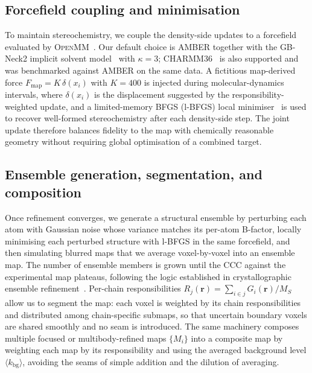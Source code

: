 \documentclass[11pt]{article}
\begin{document}
\subsection{Forcefield coupling and minimisation}
To maintain stereochemistry, we couple the density-side updates to a forcefield evaluated by \textsc{OpenMM}~\cite{eastman2017}. Our default choice is AMBER together with the GB-Neck2 implicit solvent model~\cite{nguyen2013} with $\kappa=3$; CHARMM36~\cite{huang2013} is also supported and was benchmarked against AMBER on the same data. A fictitious map-derived force $F_{\mathrm{map}} = K\,\delta(x_{i})$ with $K=400$ is injected during molecular-dynamics intervals, where $\delta(x_{i})$ is the displacement suggested by the responsibility-weighted update, and a limited-memory BFGS (l-BFGS) local minimiser~\cite{eastman2017} is used to recover well-formed stereochemistry after each density-side step. The joint update therefore balances fidelity to the map with chemically reasonable geometry without requiring global optimisation of a combined target.

\subsection{Ensemble generation, segmentation, and composition}
Once refinement converges, we generate a structural ensemble by perturbing each atom with Gaussian noise whose variance matches its per-atom B-factor, locally minimising each perturbed structure with l-BFGS in the same forcefield, and then simulating blurred maps that we average voxel-by-voxel into an ensemble map. The number of ensemble members is grown until the CCC against the experimental map plateaus, following the logic established in crystallographic ensemble refinement~\cite{levin2007,burnley2012}. Per-chain responsibilities $R_{j}(\mathbf{r}) = \sum_{i\in j} G_{i}(\mathbf{r})/M_{S}$ allow us to segment the map: each voxel is weighted by its chain responsibilities and distributed among chain-specific submaps, so that uncertain boundary voxels are shared smoothly and no seam is introduced. The same machinery composes multiple focused or multibody-refined maps $\{M_{i}\}$ into a composite map by weighting each map by its responsibility and using the averaged background level $\langle k_{\mathrm{bg}}\rangle$, avoiding the seams of simple addition and the dilution of averaging.
\end{document}
